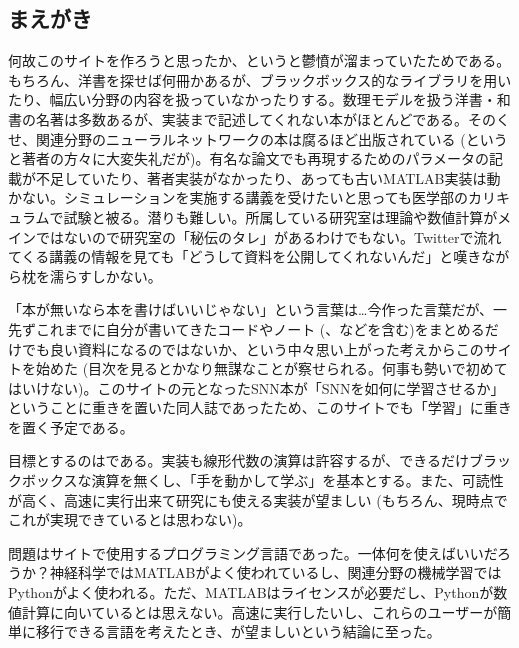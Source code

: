 \documentclass[letterpaper,10pt,english]{sphinxmanual}
\begin{document}
\subsection{まえがき}
\label{\detokenize{preface:id1}}\label{\detokenize{preface::doc}}
何故このサイトを作ろうと思ったか、というと鬱憤が溜まっていたためである。 もちろん、洋書を探せば何冊かあるが、ブラックボックス的なライブラリを用いたり、幅広い分野の内容を扱っていなかったりする。数理モデルを扱う洋書・和書の名著は多数あるが、実装まで記述してくれない本がほとんどである。そのくせ、関連分野のニューラルネットワークの本は腐るほど出版されている (というと著者の方々に大変失礼だが)。有名な論文でも再現するためのパラメータの記載が不足していたり、著者実装がなかったり、あっても古いMATLAB実装は動かない。シミュレーションを実施する講義を受けたいと思っても医学部のカリキュラムで試験と被る。潜りも難しい。所属している研究室は理論や数値計算がメインではないので研究室の「秘伝のタレ」があるわけでもない。Twitterで流れてくる講義の情報を見ても「どうして資料を公開してくれないんだ」と嘆きながら枕を濡らすしかない。

「本が無いなら本を書けばいいじゃない」という言葉は…今作った言葉だが、一先ずこれまでに自分が書いてきたコードやノート (、などを含む)をまとめるだけでも良い資料になるのではないか、という中々思い上がった考えからこのサイトを始めた (目次を見るとかなり無謀なことが察せられる。何事も勢いで初めてはいけない)。このサイトの元となったSNN本が「SNNを如何に学習させるか」ということに重きを置いた同人誌であったため、このサイトでも「学習」に重きを置く予定である。

目標とするのはである。実装も線形代数の演算は許容するが、できるだけブラックボックスな演算を無くし、「手を動かして学ぶ」を基本とする。また、可読性が高く、高速に実行出来て研究にも使える実装が望ましい (もちろん、現時点でこれが実現できているとは思わない)。

問題はサイトで使用するプログラミング言語であった。一体何を使えばいいだろうか？神経科学ではMATLABがよく使われているし、関連分野の機械学習ではPythonがよく使われる。ただ、MATLABはライセンスが必要だし、Pythonが数値計算に向いているとは思えない。高速に実行したいし、これらのユーザーが簡単に移行できる言語を考えたとき、が望ましいという結論に至った。
\end{document}
